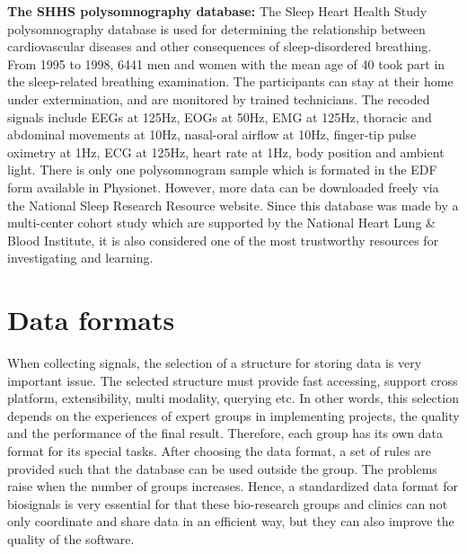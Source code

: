         \textbf{The SHHS polysomnography database: }
        The Sleep Heart Health Study polysomnography database is used for determining the relationship between cardiovascular diseases and other consequences of sleep-disordered breathing. From 1995 to 1998, 6441 men and women with the mean age of 40 took part in the sleep-related breathing examination\cite{SHSH_SleepData}. The participants can stay at their home under extermination, and are monitored by trained technicians. The recoded signals include EEGs at 125Hz, EOGs at 50Hz, EMG at 125Hz, thoracic and abdominal movements at 10Hz, nasal-oral airflow at 10Hz, finger-tip pulse oximetry at 1Hz, ECG at 125Hz, heart rate at 1Hz, body position and ambient light. There is only one polysomnogram sample which is formated in the EDF form available in Physionet. However, more data can be downloaded freely via the National Sleep Research Resource website\cite{SHSH_NationalSleepData}. Since this database was made by a multi-center cohort study which are supported by the National Heart Lung \& Blood Institute, it is also considered one of the most trustworthy resources for investigating and learning.
\section{Data formats}
    When collecting signals, the selection of a structure for storing data is very important issue. The selected structure must provide fast accessing, support cross platform, extensibility, multi modality, querying etc. In other words, this selection depends on the experiences of expert groups in implementing projects, the quality and the performance of the final result. Therefore, each group has its own data format for its special tasks. After choosing the data format, a set of rules are provided such that the database can be used outside the group. The problems raise when the number of groups increases. Hence, a standardized data format for biosignals is very essential for that these bio-research groups and clinics can not only coordinate and share data in an efficient way, but they can also improve the quality of the software.\\
